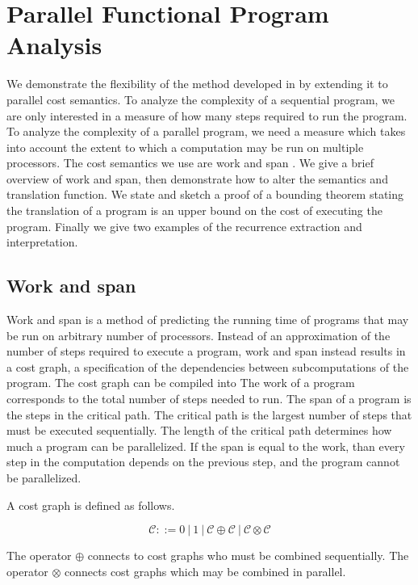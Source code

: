\chapter{Parallel Functional Program Analysis}

We demonstrate the flexibility of the method developed in \citet{Danner2015} by
extending it to parallel cost semantics.  To analyze the complexity of a
sequential program, we are only interested in a measure of how many steps
required to run the program. To analyze the complexity of a parallel program,
we need a measure which takes into account the extent to which a computation
may be run on multiple processors.  The cost semantics we use are work and span
\citet{Harper2012PFPL}.  We give a brief overview of work and span, then
demonstrate how to alter the semantics and translation function. We state and
sketch a proof of a bounding theorem stating the translation of a program is an
upper bound on the cost of executing the program. Finally we give two examples
of the recurrence extraction and interpretation.

\section{Work and span}
Work and span is a method of predicting the running time of programs that may
be run on arbitrary number of processors. Instead of an approximation of the
number of steps required to execute a program, work and span instead results in
a cost graph, a specification of the dependencies between subcomputations of
the program. The cost graph can be compiled into The work of a program
corresponds to the total number of steps needed to run.  The span of a program
is the steps in the critical path.  The critical path is the largest number of
steps that must be executed sequentially.  The length of the critical path
determines how much a program can be parallelized.  If the span is equal to the
work, than every step in the computation depends on the previous step, and the
program cannot be parallelized.


A cost graph is defined as follows.

\[ \mathcal{C} ::= 0\ |\  1\ |\  \mathcal{C} \oplus \mathcal{C}\ |\  \mathcal{C} \otimes \mathcal{C} \]

The operator $\oplus$ connects to cost graphs who must be combined
sequentially.  The operator $\otimes$ connects cost graphs which may be
combined in parallel.

